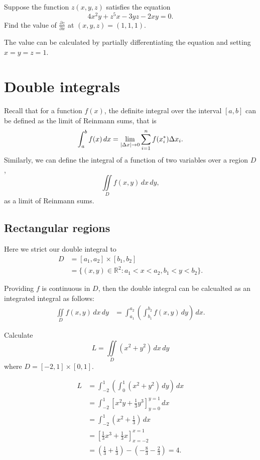\begin{example}
    Suppose the function $z(x, y, z)$ satisfies the equation \[ 4 x^2 y + z^5 x - 3 y z - 2 x y = 0. \] Find the value of $\frac{\partial z}{\partial x}$ at $(x, y, z) = (1, 1, 1)$.
    
    The value can be calculated by partially differentiating the equation and setting $x = y = z = 1$.
\end{example}

\section{Double integrals}

Recall that for a function $f(x)$, the definite integral over the interval $[a, b]$ can be defined as the limit of Reinmann sums, that is  \[ \int_{a}^{b} f(x) \, dx = \lim_{\lvert\Delta x\rvert \to 0}{\sum_{i = 1}^{n}{f(x^{*}_{i}) \Delta x_i}}. \] Similarly, we can define the integral of a function of two variables over a region $D$, \[ \iint\limits_{D} f(x, y) \, dx \, dy, \] as a limit of Reinmann sums.


\subsection{Rectangular regions}

Here we strict our double integral to 
\begin{align*}
    D &= [a_1, a_2] \times [b_1, b_2] \\
    &= \{ (x, y) \in \mathbb{R}^2 : a_1 < x < a_2, b_1 < y < b_2 \}.
\end{align*}

Providing $f$ is continuous in $D$, then the double integral can be calcualted as an integrated integral as follows:
\begin{align*}
    \iint\limits_{D} f(x, y) \, dx \, dy &= \int_{a_1}^{a_2} \left( \int_{b_1}^{b_2} f(x, y) \, dy \right) \, dx.
\end{align*}

\begin{example}
    Calculate \[ L = \iint\limits_{D} (x^2 + y^2) \, dx \, dy \] where $D = [-2, 1] \times [0, 1]$.
    
    \begin{align*}
        L &= \int_{-2}^{1} \left( \int^{1}_{0} (x^2 + y^2) \, dy \right) \, dx \\
        &= \int_{-2}^{1} \left[ x^2 y + \frac{1}{3} y^3 \right]^{y = 1}_{y = 0}\, dx \\
        &= \int^{1}_{-2} \left( x^2 + \frac{1}{3} \right) \, dx \\
        &= \left[ \frac{1}{3} x^3 + \frac{1}{3} x \right]^{x = 1}_{x = -2} \\
        &= \left( \frac{1}{3} + \frac{1}{3} \right) - \left( -\frac{8}{3} - \frac{2}{3} \right) = 4.
    \end{align*}
\end{example}

